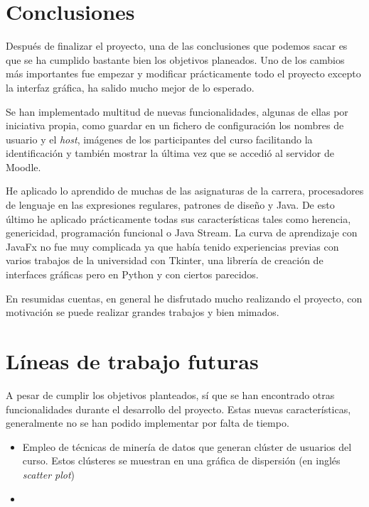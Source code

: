 
\section{Conclusiones}

Después de finalizar el proyecto, una de las conclusiones que podemos sacar es que se ha cumplido bastante bien los objetivos planeados. Uno de los cambios más importantes fue empezar y modificar prácticamente todo el proyecto excepto la interfaz gráfica, ha salido mucho mejor de lo esperado.  

Se han implementado multitud de nuevas funcionalidades, algunas de ellas por iniciativa propia, como guardar en un fichero de configuración los nombres de usuario y el \textit{host}, imágenes de los participantes del curso facilitando la identificación y también mostrar la última vez que se accedió al servidor de Moodle.

He aplicado lo aprendido de muchas de las asignaturas de la carrera, procesadores de lenguaje en las expresiones regulares, patrones de diseño y Java. De esto último he aplicado prácticamente todas sus características tales como herencia, genericidad, programación funcional o Java Stream. La curva de aprendizaje con JavaFx no fue muy complicada ya que había tenido experiencias previas con varios trabajos de la universidad con Tkinter\cite{noauthor_tkinter_nodate}, una librería de creación de interfaces gráficas pero en Python y con ciertos parecidos.

En resumidas cuentas, en general he disfrutado mucho realizando el proyecto, con motivación se puede realizar grandes trabajos y bien mimados.


\section{Líneas de trabajo futuras}

A pesar de cumplir los objetivos planteados, sí que se han encontrado otras funcionalidades durante el desarrollo del proyecto. Estas nuevas características, generalmente no se han podido implementar por falta de tiempo.

\begin{itemize}
	\item Empleo de técnicas de minería de datos que generan clúster de usuarios del curso. Estos clústeres se muestran en una gráfica de dispersión (en inglés \textit{scatter plot})
	\item 
\end{itemize}
